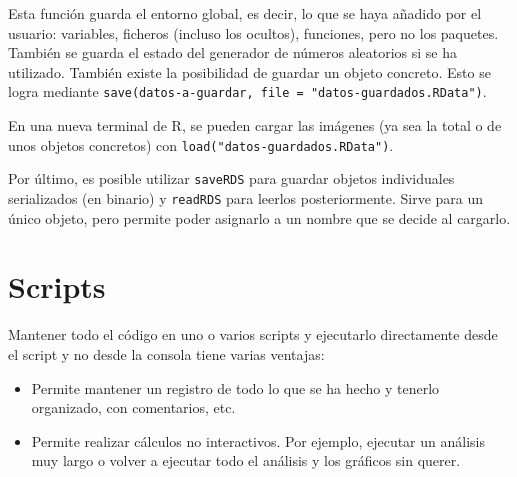 \documentclass{config/apuntes}\usepackage[]{graphicx}\usepackage[]{xcolor}
\newcommand{\code}[1]{\texttt{#1}}
\begin{document}
Esta función guarda el entorno global, es decir, lo que se haya añadido por el usuario: variables, ficheros (incluso los ocultos), funciones, pero no los paquetes. También se guarda el estado del generador de números aleatorios si se ha utilizado. También existe la posibilidad de guardar un objeto concreto. Esto se logra mediante \code{save(datos-a-guardar, file = "datos-guardados.RData")}.

En una nueva terminal de R, se pueden cargar las imágenes (ya sea la total o de unos objetos concretos) con \code{load("datos-guardados.RData")}.

Por último, es posible utilizar \code{saveRDS} para guardar objetos individuales serializados (en binario) y \code{readRDS} para leerlos posteriormente. Sirve para un único objeto, pero permite poder asignarlo a un nombre que se decide al cargarlo.

\chapter{Scripts}
Mantener todo el código en uno o varios scripts y ejecutarlo directamente desde el script y no desde la consola tiene varias ventajas:
\begin{itemize}
\item Permite mantener un registro de todo lo que se ha hecho y tenerlo organizado, con comentarios, etc.
\item Permite realizar cálculos no interactivos. Por ejemplo, ejecutar un análisis muy largo o volver a ejecutar todo el análisis y los gráficos sin querer.
\end{itemize}
\end{document}
